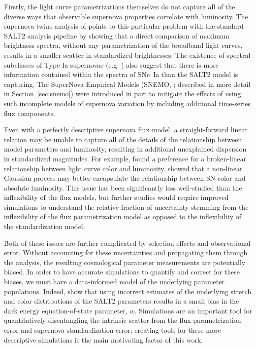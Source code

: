 Firstly, the light curve parametrizations themselves do not capture all of the diverse ways that observable supernova properties correlate with luminosity. The supernova twins analysis of \cite{fakhouri_improving_2015} points to this particular problem with the standard SALT2 analysis pipeline by showing that a direct comparison of maximum brightness spectra, without any parametrization of the broadband light curves, results in a smaller scatter in standardized brightnesses. The existence of spectral subclasses of Type Ia supernovae (e.g. \cite{branch_comparative_2006}) also suggest that there is more information contained within the spectra of SNe~Ia than the SALT2 model is capturing. The SuperNova Empirical Models (SNEMO, \cite{saunders_snemo_2018}; described in more detail in Section~\ref{sec:snemo}) were introduced in part to mitigate the effects of using such incomplete models of supernova variation by including additional time-series flux components.

Even with a perfectly descriptive supernova flux model, a straight-forward linear relation may be unable to capture all of the details of the relationship between model parameters and luminosity, resulting in additional unexplained dispersion in standardized magnitudes. For example, \cite{rubin_unity_2015} found a preference for a broken-linear relationship between light curve color and luminosity. \cite{rose_initial_2020} showed that a non-linear Gaussian process may better encapsulate the relationship between SN color and absolute luminosity. This issue has been significantly less well-studied than the inflexibility of the flux models, but further studies would require improved simulations to understand the relative fraction of uncertainty stemming from the inflexibility of the flux parametrization model as opposed to the inflexibility of the standardization model.

Both of these issues are further complicated by selection effects and observational error. Without accounting for these uncertainties and propagating them through the analysis, the resulting cosmological parameter measurements are potentially biased. In order to have accurate simulations to quantify and correct for these biases, we must have a data-informed model of the underlying parameter populations. Indeed, \cite{scolnic_measuring_2016} show that using incorrect estimates of the underlying stretch and color distributions of the SALT2 parameters results in a small bias in the dark energy equation-of-state parameter, $w$. Simulations are an important tool for quantitatively disentangling the intrinsic scatter from the flux parametrization error and supernova standardization error; creating tools for these more descriptive simulations is the main motivating factor of this work.

